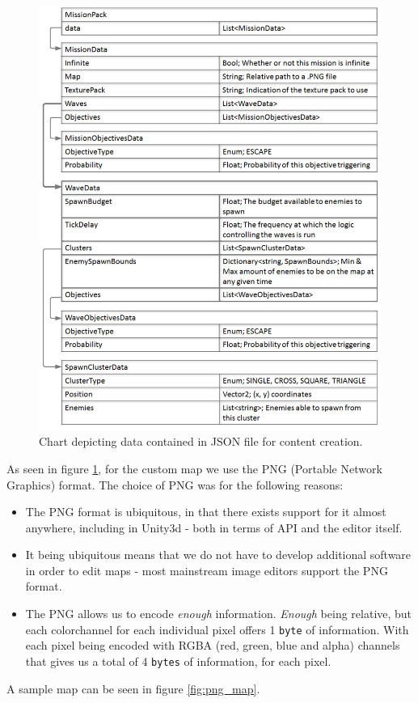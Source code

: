 \begin{figure}[H]
    \centering
    \includegraphics[width=1\textwidth]{figures/missions/chart.png}
    \caption{Chart depicting data contained in JSON file for content creation.}
    \label{fig:json_chart}
\end{figure}

As seen in figure \ref{fig:json_chart}, for the custom map we use the PNG (Portable Network Graphics) format.
The choice of PNG was for the following reasons:
\begin{itemize}
    \item The PNG format is ubiquitous, in that there exists support for it almost anywhere, including in Unity3d - both in terms of API and the editor itself.
    \item It being ubiquitous means that we do not have to develop additional software in order to edit maps - most mainstream image editors support the PNG format.
    \item The PNG allows us to encode \textit{enough} information. 
    	\textit{Enough} being relative, but each colorchannel for each individual pixel offers 1 \texttt{byte} of information.
    	With each pixel being encoded with RGBA (red, green, blue and alpha) channels that gives us a total of 4 \texttt{bytes} of information, for each pixel.
\end{itemize}

A sample map can be seen in figure \ref{fig:png_map}.
